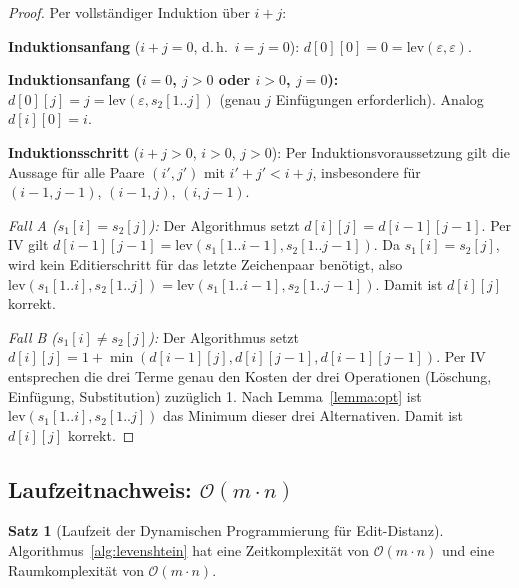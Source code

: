 ﻿\documentclass[a4paper,12pt]{article}
\theoremstyle{definition}
\newtheorem{satz}{Satz}
\begin{document}
\begin{proof}
    Per vollständiger Induktion über $i + j$:

    \textbf{Induktionsanfang} ($i + j = 0$, d.\,h.\ $i = j = 0$):
    $d[0][0] = 0 = \mathrm{lev}(\varepsilon, \varepsilon)$. \checkmark

    \textbf{Induktionsanfang ($i = 0$, $j > 0$ oder $i > 0$, $j = 0$):}
    $d[0][j] = j = \mathrm{lev}(\varepsilon, s_2[1..j])$
    (genau $j$ Einfügungen erforderlich). Analog $d[i][0] = i$. \checkmark

    \textbf{Induktionsschritt} ($i + j > 0$, $i > 0$, $j > 0$):
    Per Induktionsvoraussetzung gilt die Aussage für alle Paare $(i', j')$
    mit $i' + j' < i + j$, insbesondere für $(i-1, j-1)$, $(i-1, j)$, $(i, j-1)$.

    \emph{Fall A ($s_1[i] = s_2[j]$):} Der Algorithmus setzt
    $d[i][j] = d[i-1][j-1]$. Per IV gilt $d[i-1][j-1] = \mathrm{lev}(s_1[1..i-1], s_2[1..j-1])$.
    Da $s_1[i] = s_2[j]$, wird kein Editierschritt für das letzte Zeichenpaar
    benötigt, also $\mathrm{lev}(s_1[1..i], s_2[1..j]) = \mathrm{lev}(s_1[1..i-1], s_2[1..j-1])$.
    Damit ist $d[i][j]$ korrekt.

    \emph{Fall B ($s_1[i] \neq s_2[j]$):} Der Algorithmus setzt
    $d[i][j] = 1 + \min(d[i-1][j], d[i][j-1], d[i-1][j-1])$.
    Per IV entsprechen die drei Terme genau den Kosten der drei Operationen
    (Löschung, Einfügung, Substitution) zuzüglich 1.
    Nach Lemma~\ref{lemma:opt} ist $\mathrm{lev}(s_1[1..i], s_2[1..j])$ das
    Minimum dieser drei Alternativen. Damit ist $d[i][j]$ korrekt. \qedhere
\end{proof}

\subsection{Laufzeitnachweis: $\mathcal{O}(m \cdot n)$}

\begin{satz}[Laufzeit der Dynamischen Programmierung für Edit-Distanz]
    \label{satz:lev_runtime}
    Algorithmus~\ref{alg:levenshtein} hat eine Zeitkomplexität von
    $\mathcal{O}(m \cdot n)$ und eine Raumkomplexität von $\mathcal{O}(m \cdot n)$.
\end{satz}
\end{document}
